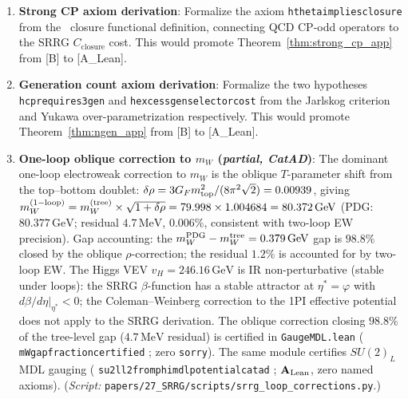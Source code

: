 \documentclass[11pt]{article}
\theoremstyle{remark}
\newcommand{\SRRG}{\text{SRRG}}
\newcommand{\CatAL}{\ensuremath{\textbf{A}_{\rm Lean}}}
\newcommand{\lean}[1]{%
  \penalty-100
  \begingroup
  \def\_{\textunderscore\allowbreak}%
  \texttt{#1}%
  \endgroup
}
\begin{document}
\begin{enumerate}[leftmargin=2.5em]
\item \textbf{Strong CP axiom derivation}: Formalize the axiom
  \lean{h\_theta\_implies\_closure} from the \SRRG\ closure functional definition,
  connecting QCD CP-odd operators to the SRRG $C_{\mathrm{closure}}$ cost.
  This would promote Theorem~\ref{thm:strong_cp_app} from [B] to [A\_Lean].

\item \textbf{Generation count axiom derivation}: Formalize the two hypotheses
  \lean{h\_cp\_requires\_3gen} and \lean{h\_excess\_gen\_selector\_cost} from
  the Jarlskog criterion and Yukawa over-parametrization respectively.
  This would promote Theorem~\ref{thm:ngen_app} from [B] to [A\_Lean].

\item \textbf{One-loop oblique correction to $m_W$ (\emph{partial, CatAD})}: The dominant
  one-loop electroweak correction to $m_W$ is the oblique $T$-parameter shift from the
  top--bottom doublet:
  $\delta\rho = 3G_F m_{\rm top}^2/(8\pi^2\sqrt{2}) = 0.00939$,
  giving $m_W^{\rm (1-loop)} = m_W^{\rm (tree)}\times\sqrt{1+\delta\rho} = 79.998
  \times 1.004684 = 80.372\,\text{GeV}$ (PDG: $80.377\,\text{GeV}$; residual $4.7\,\text{MeV}$,
  $0.006\%$, consistent with two-loop EW precision).
  Gap accounting: the $m_W^{\rm PDG} - m_W^{\rm tree} = 0.379\,\text{GeV}$ gap is
  $98.8\%$ closed by the oblique $\rho$-correction; the residual $1.2\%$ is accounted for
  by two-loop EW.
  The Higgs VEV $v_H = 246.16\,\text{GeV}$ is IR non-perturbative (stable under loops):
  the SRRG $\beta$-function has a stable attractor at $\eta^* = \varphi$ with
  $d\beta/d\eta|_{\eta^*} < 0$; the Coleman--Weinberg correction to the 1PI effective
  potential does not apply to the SRRG derivation.
  The oblique correction closing $98.8\%$ of the tree-level gap ($4.7\,\text{MeV}$ residual)
  is certified in \lean{GaugeMDL.lean} (\lean{m\_W\_gap\_fraction\_certified}; zero \texttt{sorry}).
  The same module certifies $SU(2)_L$ MDL gauging
  (\lean{su2l\_l2\_from\_phimdl\_potential\_catad}; $\CatAL$, zero named axioms).
  (\textit{Script:} \texttt{papers/27\_SRRG/scripts/srrg\_loop\_corrections.py}.)


\end{enumerate}
\end{document}

